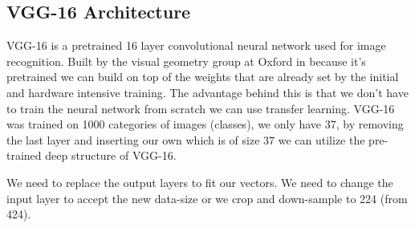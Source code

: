 \subsection{VGG-16 Architecture}

VGG-16 is a pretrained 16 layer convolutional neural network used for image recognition. Built by the visual geometry group at Oxford in \citeyear{vgg16-arxiv} \cite{vgg16-arxiv} because it's pretrained we can build on top of the weights that are already set by the initial and hardware intensive training. The advantage behind this is that we don't have to train the neural network from scratch we can use transfer learning. VGG-16 was trained on 1000 categories of images (classes), we only have 37, by removing the last layer and inserting our own which is of size 37 we can utilize the pre-trained deep structure of VGG-16.



We need to replace the output layers to fit our vectors.
We need to change the input layer to accept the new data-size or we crop and down-sample to 224 (from 424).
